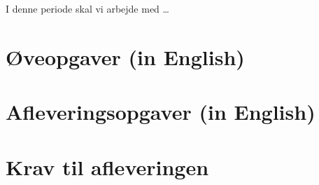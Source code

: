 \documentclass[a4paper,12pt]{article}
\newcommand{\exerciseNumber}{7}
\begin{document}
\maketitle

I denne periode skal vi arbejde med \dots



\learningConditionsTxt{\typeLetter}

\section*{Øveopgaver (in English)}

\section*{Afleveringsopgaver (in English)}

\section*{Krav til afleveringen}
\end{document}
